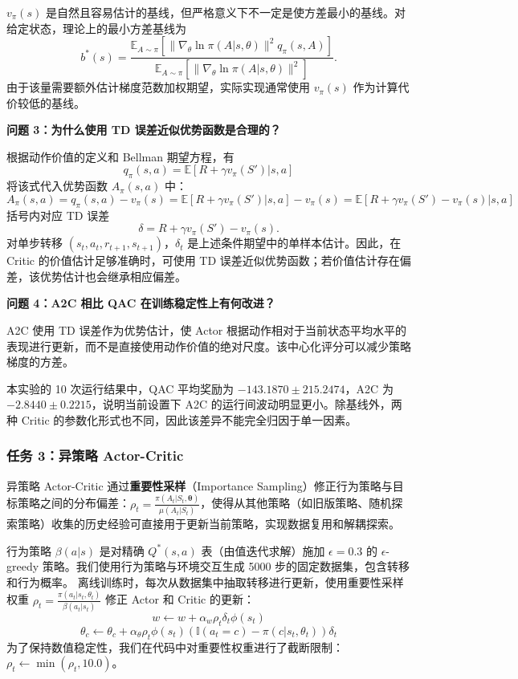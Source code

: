 \documentclass[11pt,a4paper,UTF8]{ctexart}
\numberwithin{figure}{section}
\numberwithin{table}{section}
\newcommand{\answerlabel}{%
  \par\smallskip\noindent{\heiti\bfseries 回答：}\quad}
\newcommand{\question}[1]{\par\smallskip\noindent\textbf{#1}\par}
\begin{document}
$v_\pi(s)$ 是自然且容易估计的基线，但严格意义下不一定是使方差最小的基线。对给定状态，理论上的最小方差基线为
\[
b^*(s)=
\frac{\mathbb{E}_{A\sim\pi}
\left[\|\nabla_\theta\ln\pi(A|s,\theta)\|^2q_\pi(s,A)\right]}
{\mathbb{E}_{A\sim\pi}
\left[\|\nabla_\theta\ln\pi(A|s,\theta)\|^2\right]}.
\]
由于该量需要额外估计梯度范数加权期望，实际实现通常使用 $v_\pi(s)$ 作为计算代价较低的基线。

\question{问题 3：为什么使用 TD 误差近似优势函数是合理的？}

\answerlabel 根据动作价值的定义和 Bellman 期望方程，有
$$q_\pi(s, a) = \mathbb{E}[R + \gamma v_\pi(S') | s, a]$$
将该式代入优势函数 $A_\pi(s,a)$ 中：
$$A_\pi(s, a) = q_\pi(s, a) - v_\pi(s) = \mathbb{E}[R + \gamma v_\pi(S') | s, a] - v_\pi(s) = \mathbb{E}[R + \gamma v_\pi(S') - v_\pi(s) | s, a]$$
括号内对应 TD 误差
\[
\delta=R+\gamma v_\pi(S')-v_\pi(s).
\]
对单步转移 $(s_t,a_t,r_{t+1},s_{t+1})$，$\delta_t$ 是上述条件期望中的单样本估计。因此，在 Critic 的价值估计足够准确时，可使用 TD 误差近似优势函数；若价值估计存在偏差，该优势估计也会继承相应偏差。

\question{问题 4：A2C 相比 QAC 在训练稳定性上有何改进？}

\answerlabel A2C 使用 TD 误差作为优势估计，使 Actor 根据动作相对于当前状态平均水平的表现进行更新，而不是直接使用动作价值的绝对尺度。该中心化评分可以减少策略梯度的方差。

本实验的 10 次运行结果中，QAC 平均奖励为 $-143.1870\pm215.2474$，A2C 为 $-2.8440\pm0.2215$，说明当前设置下 A2C 的运行间波动明显更小。除基线外，两种 Critic 的参数化形式也不同，因此该差异不能完全归因于单一因素。

\subsubsection{任务 3：异策略 Actor-Critic}

异策略 Actor-Critic 通过\textbf{重要性采样}（Importance Sampling）修正行为策略与目标策略之间的分布偏差：$\rho_t = \frac{\pi(A_t|S_t,\boldsymbol{\theta})}{\mu(A_t|S_t)}$，使得从其他策略（如旧版策略、随机探索策略）收集的历史经验可直接用于更新当前策略，实现数据复用和解耦探索。

行为策略 $\beta(a|s)$ 是对精确 $Q^*(s,a)$ 表（由值迭代求解）施加 $\epsilon=0.3$ 的 $\epsilon$-greedy 策略。我们使用行为策略与环境交互生成 5000 步的固定数据集，包含转移和行为概率。
离线训练时，每次从数据集中抽取转移进行更新，使用重要性采样权重 $\rho_t = \frac{\pi(a_t|s_t, \theta_t)}{\beta(a_t|s_t)}$ 修正 Actor 和 Critic 的更新：
$$w \leftarrow w + \alpha_w \rho_t \delta_t \phi(s_t)$$
$$\theta_c \leftarrow \theta_c + \alpha_\theta \rho_t \phi(s_t) \left( \mathbb{I}(a_t = c) - \pi(c|s_t, \theta_t) \right) \delta_t$$
为了保持数值稳定性，我们在代码中对重要性权重进行了截断限制：$\rho_t \leftarrow \min(\rho_t, 10.0)$。
\end{document}
